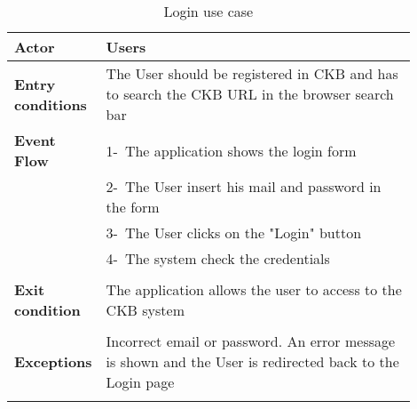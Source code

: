 \begin{center}
    \begin{longtable}{|l|p{0.9\linewidth}|}
        \hline
        \textbf{Actor}            & Users                                                                                                                                                                                        \\
        \hline
        \textbf{Entry conditions} & The User should be registered in CKB and has to search the CKB URL in the browser search bar                                                                                                                   \\
        \hline
        \textbf{Event Flow}       & 1-\ The application shows the login form                                                     \\
        & 2-\ The User insert his mail and password in the form \\
        & 3-\ The User clicks on the "Login" button       \\                                                                                                                      
        & 4-\ The system check the credentials  \\                                                                                                                                                                                                                                     \\
        \hline
        \textbf{Exit condition}   & The application allows the user to access to the CKB system \\                                                                                                                                                                                \\
        \hline
        \textbf{Exceptions}       & Incorrect email or password. An error message is shown and the User is redirected back to the Login page                                                                                                                        \\
        \hline
        \caption{Login use case}
        \label{tab: login_use_case}
    \end{longtable}
\end{center}

